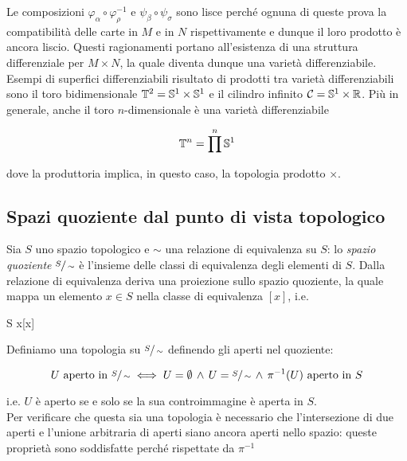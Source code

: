 Le composizioni $ \varphi_{\alpha} \circ \varphi_{\rho}^{-1} $ e $ \psi_{\beta} \circ \psi_{\sigma} $ sono lisce perché ognuna di queste prova la compatibilità delle carte in $ M $ e in $ N $ rispettivamente e dunque il loro prodotto è ancora liscio. Questi ragionamenti portano all'esistenza di una struttura differenziale per $ M \times N $, la quale diventa dunque una varietà differenziabile. \\
Esempi di superfici differenziabili risultato di prodotti tra varietà differenziabili sono il toro bidimensionale $ \mathbb{T}^{2} = \mathbb{S}^{1} \times \mathbb{S}^{1} $ e il cilindro infinito $ \mathcal{C} = \mathbb{S}^{1} \times \mathbb{R} $. Più in generale, anche il toro $ n $-dimensionale è una varietà differenziabile

\begin{align}
	\mathbb{T}^{n} = \prod^{n} \mathbb{S}^{1}
\end{align}

dove la produttoria implica, in questo caso, la topologia prodotto $ \times $.

\subsection{Spazi quoziente dal punto di vista topologico}\label{s-sec:quot}

Sia $ S $ uno spazio topologico e $ \sim $ una relazione di equivalenza su $ S $: lo \textit{spazio quoziente} $ \sfrac{S}{\sim} $ è l'insieme delle classi di equivalenza degli elementi di $ S $. Dalla relazione di equivalenza deriva una proiezione sullo spazio quoziente, la quale mappa un elemento $ x \in S $ nella classe di equivalenza $ [x] $, i.e.

\map{\pi}
	{S}{}
	{x}{[x]}
	
Definiamo una topologia su $ \sfrac{S}{\sim} $ definendo gli aperti nel quoziente:

\begin{equation}
	U \text{ aperto in } \sfrac{S}{\sim} %
	\iff %
	U = \emptyset \, \wedge \, U = \sfrac{S}{\sim} \, \wedge \, \pi^{-1}(U) \text{ aperto in } S
\end{equation}

i.e. $ U $ è aperto se e solo se la sua controimmagine è aperta in $ S $. \\
Per verificare che questa sia una topologia è necessario che l'intersezione di due aperti e l'unione arbitraria di aperti siano ancora aperti nello spazio: queste proprietà sono soddisfatte perché rispettate da $ \pi^{-1} $

